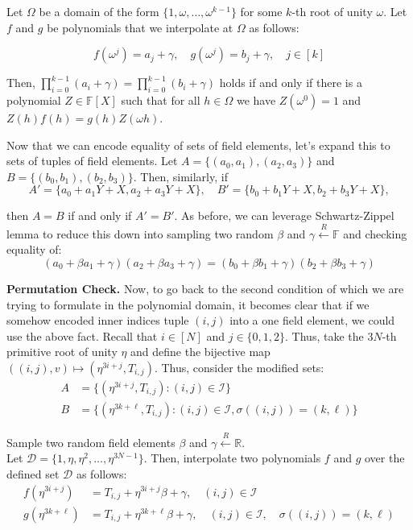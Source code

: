 \documentclass[../lecture-notes.tex]{subfiles}
\begin{document}
Let $\Omega$ be a domain of the form \(\{1, \omega, \dots, \omega^{k-1}\}\) for
some $k$-th root of unity $\omega$. Let $f$ and $g$ be polynomials that we
interpolate at $\Omega$ as follows:

\begin{equation*}
    f(\omega^j) = a_j + \gamma, \quad g(\omega^j) = b_j + \gamma, \quad j \in [k]
\end{equation*}

Then, \(\prod_{i=0}^{k-1} (a_i + \gamma) = \prod_{i=0}^{k-1} (b_i + \gamma)\) holds if and only if there is a polynomial $Z \in \mathbb{F}[X]$ such that for all $h \in \Omega$ we have $Z(\omega^{0}) = 1$ and $Z(h)f(h) = g(h)Z(\omega h)$.

Now that we can encode equality of sets of field elements, let's expand this to sets of tuples of field elements. Let \(A = \{(a_0, a_1), (a_2, a_3)\}\) and \(B = \{(b_0, b_1), (b_2, b_3)\}\). Then, similarly, if
\[A' = \{a_0 + a_1Y + X, a_2 + a_3Y + X\}, \quad B' = \{b_0 + b_1Y + X, b_2 + b_3Y + X\},\]

then $A=B$ if and only if $A'=B'$. As before, we can leverage Schwartz-Zippel lemma to reduce this down into sampling two random $\beta$ and $\gamma \xleftarrow{R} \mathbb{F}$ and checking equality of:
\begin{equation*}
    (a_0 + \beta a_1 + \gamma)(a_2 + \beta a_3 + \gamma) = (b_0 + \beta b_1 + \gamma)(b_2 + \beta b_3 + \gamma)
\end{equation*}

\textbf{Permutation Check.} Now, to go back to the second condition of
 which we are trying to formulate in the polynomial
domain, it becomes clear that if we somehow encoded inner indices tuple $(i, j)$
into a one field element, we could use the above fact. Recall that $i \in [N]$
and $j \in \{0,1,2\}$. Thus, take the $3N$-th primitive root of unity $\eta$ and
define the bijective map $((i,j),v) \mapsto (\eta^{3i+j}, T_{i,j})$. Thus,
consider the modified sets:
\begin{align*}
    A &= \{(\eta^{3i+j}, T_{i,j}) : (i, j) \in \mathcal{I}\} \\
    B &= \{(\eta^{3k+\ell}, T_{i,j}) : (i, j) \in \mathcal{I}, \sigma((i, j)) = (k, \ell)\}
\end{align*}

Sample two random field elements $\beta$ and $\gamma \xleftarrow{R} \mathbb{R}$. \\
Let $\mathcal{D} = \{1, \eta, \eta^2, \ldots, \eta^{3N-1}\}$. Then, interpolate two 
polynomials $f$ and $g$ over the defined set $\mathcal{D}$ as follows:
\begin{align*}
    f(\eta^{3i+j}) &= T_{i,j} + \eta^{3i+j}\beta + \gamma, \quad (i, j) \in \mathcal{I} \\
    g(\eta^{3k+\ell}) &= T_{i,j} + \eta^{3k+\ell}\beta + \gamma, \quad (i, j) \in \mathcal{I}, \quad \sigma((i, j)) = (k, \ell)
\end{align*}
\end{document}
